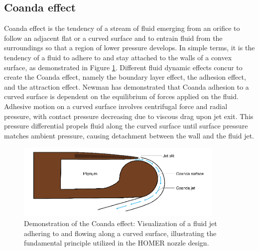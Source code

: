 \subsection{Coanda effect}
Coanda effect is the tendency of a stream of fluid emerging from an orifice to follow an adjacent flat or a curved surface and to entrain fluid from the surroundings so that a region of lower pressure develops. In simple terms, it is the tendency of a fluid to adhere to and stay attached to the walls of a convex surface, as demonstrated in Figure \ref{fig:Coanda}. Different fluid dynamic effects concur to create the Coanda effect, namely the boundary layer effect, the adhesion effect, and the attraction effect. Newman \cite{newman} has demonstrated that Coanda adhesion to a curved surface is dependent on the equilibrium of forces applied on the fluid. Adhesive motion on a curved surface involves centrifugal force and radial pressure, with contact pressure decreasing due to viscous drag upon jet exit. This pressure differential propels fluid along the curved surface until surface pressure matches ambient pressure, causing detachment between the wall and the fluid jet. 
\begin{figure}[ht]
    \centering
    \includegraphics[width=10cm]{images/Theory-CFD/Coanda-effect.png}
    \caption{Demonstration of the Coanda effect: Visualization of a fluid jet adhering to and flowing along a curved surface, illustrating the fundamental principle utilized in the HOMER nozzle design.}
    \label{fig:Coanda}
  \end{figure}

